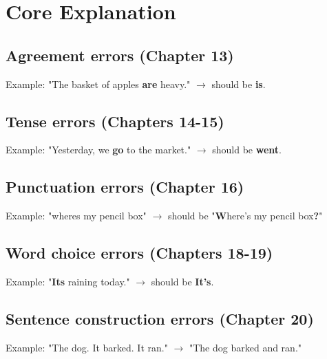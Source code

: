 \section{Core Explanation}
\subsection*{Agreement errors (Chapter 13)}
Example: "The basket of apples \textbf{are} heavy." $\rightarrow$ should be \textbf{is}.

\subsection*{Tense errors (Chapters 14-15)}
Example: "Yesterday, we \textbf{go} to the market." $\rightarrow$ should be \textbf{went}.

\subsection*{Punctuation errors (Chapter 16)}
Example: "wheres my pencil box" $\rightarrow$ should be "\textbf{W}here's my pencil box\textbf{?}"

\subsection*{Word choice errors (Chapters 18-19)}
Example: "\textbf{Its} raining today." $\rightarrow$ should be \textbf{It's}.

\subsection*{Sentence construction errors (Chapter 20)}
Example: "The dog. It barked. It ran." $\rightarrow$ "The dog barked and ran."

